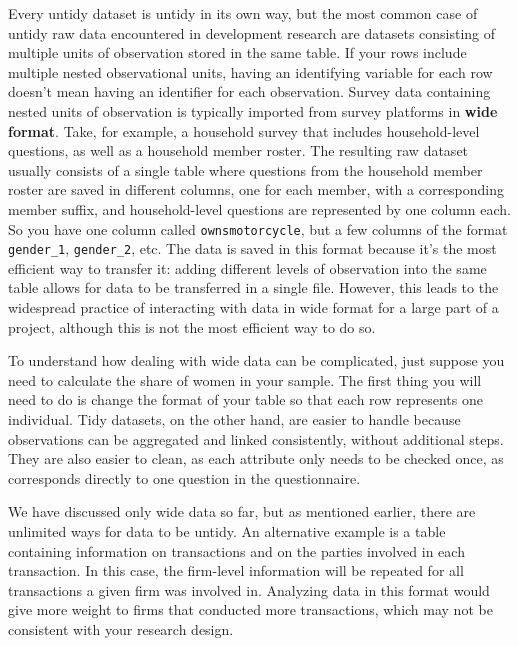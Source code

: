 Every untidy dataset is untidy in its own way,
but the most common case of untidy raw data encountered in development research
are datasets consisting of multiple units of observation stored in the same table. 
If your rows include multiple nested observational units,
having an identifying variable for each row doesn't mean having an identifier for each observation.
Survey data containing nested units of observation is typically 
imported from survey platforms in \textbf{wide format}.
Take, for example, a household survey that includes household-level questions,
as well as a household member roster.
The resulting raw dataset usually consists of a single table
where questions from the household member roster are saved in different columns, 
one for each member, with a corresponding member suffix,
and household-level questions are represented by one column each.
So you have one column called \texttt{ownsmotorcycle},
but a few columns of the format \texttt{gender\_1}, \texttt{gender\_2}, etc.
The data is saved in this format because it's the most efficient way to transfer it:
adding different levels of observation into the same table allows for data to be transferred in a single file.
However, this leads to the widespread practice of interacting with data in wide format for a large part of a project,
although this is not the most efficient way to do so.

To understand how dealing with wide data can be complicated,
just suppose you need to calculate the share of women in your sample.
The first thing you will need to do is change the format of your table so that each row represents one individual.
Tidy datasets, on the other hand, 
are easier to handle because observations can be aggregated and linked consistently,
without additional steps.
They are also easier to clean, 
as each attribute only needs to be checked once,
as corresponds directly to one question in the questionnaire.

We have discussed only wide data so far,
but as mentioned earlier, there are unlimited ways for data to be untidy.
An alternative example is a table containing information on transactions
and on the parties involved in each transaction.
In this case, the firm-level information will be repeated for all transactions a given firm was involved in.
Analyzing data in this format would give more weight to firms that conducted more transactions,
which may not be consistent with your research design.

